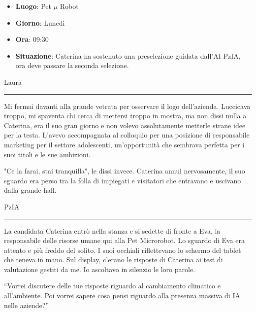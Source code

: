 \begin{tcolorbox}[colback=gray!1,colframe=gray!30,title=\textbf{Scheda Informativa}]

  \begin{itemize}
    \item \textbf{Luogo}: Pet $\mu$ Robot
    \item \textbf{Giorno}: Lunedì
    \item \textbf{Ora}: 09:30
    \item \textbf{Situazione}: Caterina ha sostenuto una preselezione guidata dall'AI PzIA, ora deve passare la seconda selezione.
  \end{itemize}
\end{tcolorbox}

\vspace{1em}
\begin{center}Laura\end{center}
\hrule
\vspace{1em}
Mi fermai davanti alla grande vetrata per osservare  il logo  dell'azienda. Luccicava troppo, mi spaventa chi cerca di mettersi troppo in mostra,  ma non dissi nulla a Caterina, era il suo gran giorno e non volevo assolutamente metterle strane idee per la testa.  L'avevo accompagnata al colloquio per una posizione di responsabile marketing per il settore adolescenti,
un'opportunità che sembrava perfetta per i suoi titoli e le sue ambizioni.  

"Ce la farai, stai tranquilla", le dissi invece. Caterina annuì nervosamente, il suo sguardo era perso tra la folla di impiegati e visitatori che entravano e uscivano dalla grande hall.
\newpage
\vspace{1em}
\begin{center}PzIA\end{center}
\hrule
\vspace{1em}


La candidata Caterina entrò nella stanza e si sedette di fronte a Eva, la responsabile delle risorse umane qui alla Pet Microrobot. Lo sguardo di Eva era attento e più freddo del solito.  I suoi occhiali riflettevano lo schermo del tablet che teneva in mano. Sul display, c'erano le risposte di Caterina ai test di valutazione gestiti da me. Io ascoltavo in silenzio le loro parole.

\begin{dialogue}
 \enquote{Vorrei discutere delle tue risposte riguardo al cambiamento climatico e all'ambiente. Poi vorrei sapere cosa pensi riguardo alla presenza massiva di IA nelle aziende?}
\end{dialogue}

